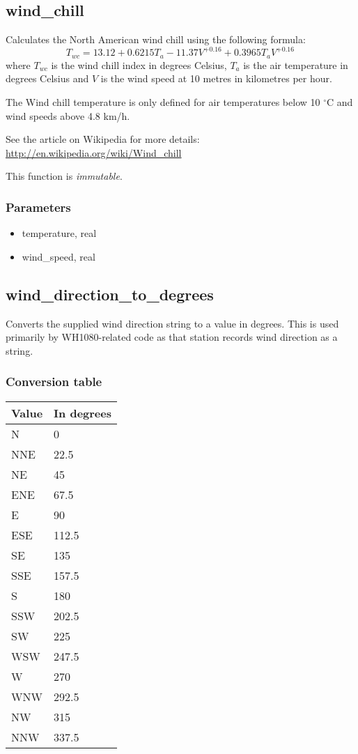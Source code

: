 \documentclass[a4paper,10pt]{book}
\begin{document}
\subsection{wind\_chill}
\label{wind_chill}
Calculates the North American wind chill using the following formula:
$$T_{wc}=13.12 + 0.6215 T_a-11.37 V^{+0.16} + 0.3965 T_a V^{+0.16}\,\!$$
where $T_{wc}$ is the wind chill index in degrees Celsius, $T_a$ is the air temperature in degrees Celsius and $V$ is the wind speed at 10 metres in kilometres per hour.

The Wind chill temperature is only defined for air temperatures below 10 $^{\circ}$C and wind speeds above 4.8 km/h.

See the article on Wikipedia for more details:
\url{http://en.wikipedia.org/wiki/Wind_chill}

This function is \emph{immutable}.

\subsubsection{Parameters}
\begin{itemize}
\item temperature, real
\item wind\_speed, real
\end{itemize}

\subsection{wind\_direction\_to\_degrees}
\label{func_wind_direction_to_degrees}
Converts the supplied wind direction string to a value in degrees. This is used primarily by WH1080-related code as that station records wind direction as a string.

\subsubsection{Conversion table}
\begin{tabular}{l l}
\hline
\textbf{Value} & \textbf{In degrees} \\
\hline
N & 0\\
NNE & 22.5\\
NE & 45\\
ENE & 67.5\\
E & 90\\
ESE & 112.5\\
SE & 135\\
SSE & 157.5\\
S & 180\\
SSW & 202.5\\
SW & 225\\
WSW & 247.5\\
W & 270\\
WNW & 292.5\\
NW & 315\\
NNW & 337.5\\
\hline
\end{tabular}
\end{document}
